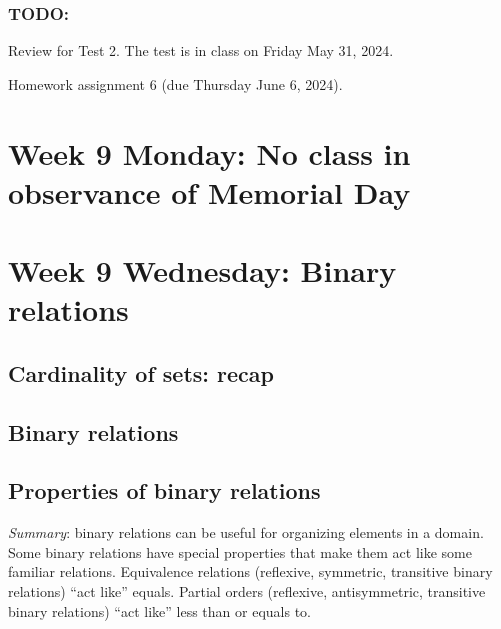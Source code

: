 \subsubsection*{TODO:}
\begin{list}
   {\itemsep2pt}
   \item Review for Test 2. The test is in class on Friday May 31, 2024.
   \item Homework assignment 6 (due Thursday June 6, 2024).
\end{list}

\newpage
\section*{Week 9 Monday: No class in observance of Memorial Day}
\section*{Week 9 Wednesday: Binary relations}

\subsection*{Cardinality of sets: recap}

\newpage
\subsection*{Binary relations}

\vfill

\vfill
\newpage

\newpage
\subsection*{Properties of binary relations}


\vfill


\vfill


\vfill


\vfill
\newpage

\vfill

{\it Summary}: binary relations can be useful for organizing elements in a domain. 
Some binary relations have special properties that make them act like some familiar relations.
Equivalence relations (reflexive, symmetric, transitive binary relations) ``act like'' equals.
Partial orders (reflexive, antisymmetric, transitive binary relations) ``act like'' less than or equals to.


\newpage

